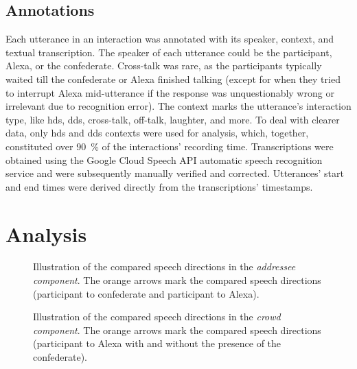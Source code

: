 \subsection{Annotations}
\label{subsec:annotations_hhci}

Each utterance in an interaction was annotated with its speaker, context, and textual transcription.
The speaker of each utterance could be the participant, Alexa, or the confederate.
Cross-talk was rare, as the participants typically waited till the confederate or Alexa finished talking (except for when they tried to interrupt Alexa mid-utterance if the response was unquestionably wrong or irrelevant due to recognition error).
The context marks the utterance's interaction type, like \ac{hds}, \ac{dds}, cross-talk, off-talk, laughter, and more.
To deal with clearer data, only \ac{hds} and \ac{dds} contexts were used for analysis, which, together, constituted over \SI{90}{\percent} of the interactions' recording time.
Transcriptions were obtained using the Google Cloud Speech API automatic speech recognition service and were subsequently manually verified and corrected.
Utterances' start and end times were derived directly from the transcriptions' timestamps.

\section{Analysis}
\label{sec:analysis_hhci}

\begin{figure}[t]
	\centering
	\hfill
	\caption[\acs{hds} and \acs{dds} compared in confederate condition]
		{Illustration of the compared speech directions in the \emph{addressee component}.
		The orange arrows mark the compared speech directions (participant to confederate and participant to Alexa).}
	\label{fig:condition_comparison_addressee}
\end{figure}

\begin{figure}[t]
	\centering
	\hfill
	\caption[\acs{dds} compared in solo and confederate conditions]
		{Illustration of the compared speech directions in the \emph{crowd component}.
		The orange arrows mark the compared speech directions (participant to Alexa with and without the presence of the confederate).}
	\label{fig:condition_comparison_crowd}
\end{figure}

